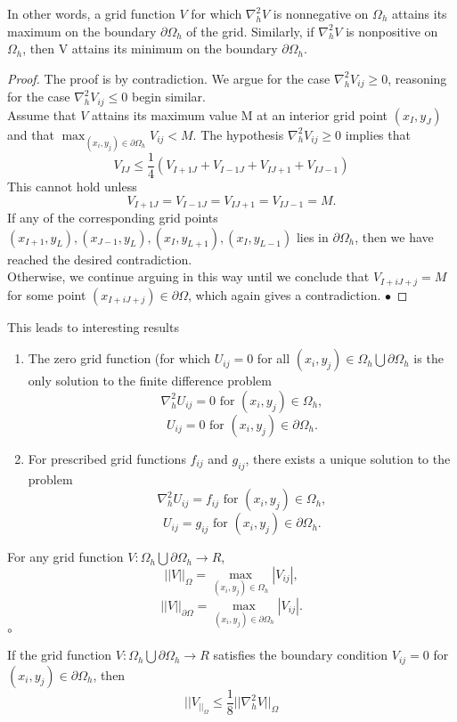 In other words, a grid function $V$ for which $\nabla^2_hV$ is nonnegative on $\Omega_h$ attains its maximum on the boundary $\partial\Omega_h$ of the grid.  Similarly, if $\nabla^2_hV$ is nonpositive on $\Omega_h$, then V attains its minimum on the boundary $\partial\Omega_h$.
\begin{proof}
The proof is by contradiction.  We argue for the case $\nabla_h^2V_{ij} \geq 0$, reasoning for the case $\nabla_h^2V_{ij}\leq 0$ begin similar.\\
Assume that $V$ attains its maximum value M at an interior grid point $(x_I,y_J)$ and that $\max_{(x_i,y_j)\in\partial\Omega_h}V_{ij}<M.$ The hypothesis $\nabla_{h}^2V_{ij} \geq 0$ implies that
\[ V_{IJ}\leq\frac{1}{4}(V_{I+1J}+V_{I-1J}+V_{IJ+1}+V_{IJ-1}) \]
This cannot hold unless
\[ V_{I+1J}=V_{I-1J}=V_{IJ+1}=V_{IJ-1}=M. \]
If any of the corresponding grid points $(x_{I+1},y_{L}),(x_{J-1},y_{L}),(x_{I},y_{L+1}),(x_{I},y_{L-1})$ lies in $\partial\Omega_h$, then we have reached the 
desired contradiction.\\
Otherwise, we continue arguing in this way until we conclude that $V_{I+iJ+j}=M$
for some point $(x_{I+iJ+j})\in \partial\Omega$, which again gives a contradiction.
$\bullet$\end{proof}
This leads to interesting results
\begin{proposition}
\begin{enumerate}
\item
The zero grid function (for which $U_{ij}=0$ for all $(x_i,y_j) \in \Omega_h \bigcup \partial\Omega_h$
is the only solution to the finite difference problem
\[\nabla_h^2U_{ij}=0 \mbox{ for }(x_i,y_j)\in\Omega_h,\]
\[U_{ij}=0 \mbox{ for }(x_i,y_j)\in\partial\Omega_h.\]
\item
For prescribed grid functions $f_{ij}$ and $g_{ij}$, there exists a unique solution to the problem
\[\nabla_h^2U_{ij}=f_{ij} \mbox{ for }(x_i,y_j)\in\Omega_h,\]
\[U_{ij}=g_{ij} \mbox{ for }(x_i,y_j)\in\partial\Omega_h.\]
\end{enumerate}
\end{proposition}
\begin{definition}
For any grid function $V:\Omega_h\bigcup\partial\Omega_h \rightarrow R$,
\[||V||_{\Omega} =\max_{(x_i,y_j)\in\Omega_h}|V_{ij}|, \]
\[||V||_{\partial\Omega} =\max_{(x_i,y_j)\in\partial\Omega_h}|V_{ij}|. \]
$\circ$
\end{definition}
\begin{lemma}
If the grid function $V:\Omega_h\bigcup\partial\Omega_h\rightarrow R$ satisfies the boundary condition $V_{ij}=0$ for $(x_i,y_j)\in \partial\Omega_h$, then
\[||V_||_{\Omega}\leq \frac{1}{8}||\nabla_h^2V||_{\Omega} \]
\end{lemma}
